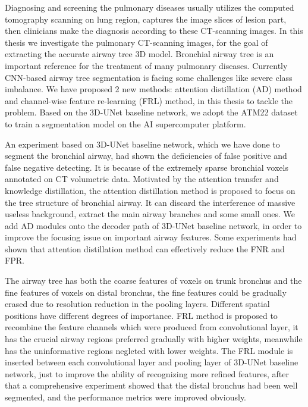 \begin{abstract*}

  Diagnosing and screening the pulmonary diseases usually utilizes the computed tomography scanning on lung region, 
  captures the image slices of lesion part, then clinicians make the diagnosis according to these CT-scanning images.
  In this thesis we investigate the pulmonary CT-scanning images, for the goal of extracting the accurate airway tree 
  3D model. Bronchial airway tree is an important reference for the treatment of many pulmonary diseases. Currently 
  CNN-based airway tree segmentation is facing some challenges like severe class imbalance. We have proposed 2 new 
  methods: attention distillation (AD) method and channel-wise feature re-learning (FRL) method, in this thesis to 
  tackle the problem. Based on the 3D-UNet baseline network, we adopt the ATM22 dataset to train a segmentation model 
  on the AI supercomputer platform.

  An experiment based on 3D-UNet baseline network, which we have done to segment the bronchial airway, had shown the 
  deficiencies of false positive and false negative detecting.
  It is because of the extremely sparse bronchial voxels annotated on CT volumetric data. Motivated by the attention 
  transfer and knowledge distillation, the attention distillation method is proposed to focus on the tree structure 
  of bronchial airway. It can discard the interference of massive useless background, extract the main airway branches 
  and some small ones. We add AD modules onto the decoder path of 3D-UNet baseline network, in order to improve the 
  focusing issue on important airway features. Some experiments had shown that attention distillation method can 
  effectively reduce the FNR and FPR.

  The airway tree has both the coarse features of voxels on trunk bronchus and the fine features of voxels on distal 
  bronchus, the fine features could be gradually erased due to resolution reduction in the pooling layers. Different 
  spatial positions have different degrees of importance. FRL method is proposed to recombine the feature channels which 
  were produced from convolutional layer, it has the crucial airway regions preferred gradually with higher weights, 
  meanwhile has the uninformative regions negleted with lower weights.
  The FRL module is inserted between each convolutional layer and pooling layer of 3D-UNet baseline network, just to 
  improve the ability of recognizing more refined features, after that a comprehensive experiment showed that the 
  distal bronchus had been well segmented, and the performance metrics were improved obviously.

\end{abstract*}
